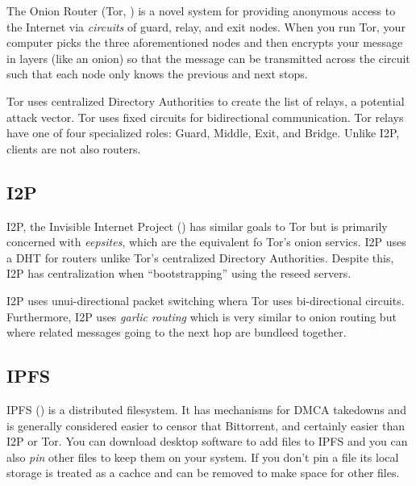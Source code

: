 The Onion Router (Tor, \cite{TorProjectPrivacy}) is a novel system for providing
anonymous access to the Internet via \emph{circuits} of guard, relay, and exit
nodes. When you run Tor, your computer picks the three aforementioned nodes and
then encrypts your message in layers (like an onion) so that the message can be
transmitted across the circuit such that each node only knows the previous and
next stops.



Tor uses centralized Directory Authorities \cite{TorProjectDirectory} to create
the list of relays, a potential attack vector. Tor uses fixed circuits for
bidirectional communication.\cite{AnalyzingTrendsTor} Tor relays have one of
four specialized roles: Guard, Middle, Exit, and Bridge. Unlike I2P, clients are
not also routers.

\subsection{I2P}\label{i2p}

I2P, the Invisible Internet Project (\cite{I2PAnonymousNetwork}) has similar
goals to Tor but is primarily concerned with \emph{eepsites}, which are the
equivalent fo Tor's onion servics. I2P uses a DHT for routers unlike Tor's
centralized Directory Authorities.\cite{NetworkDatabaseI2P} Despite this, I2P
has centralization when ``bootstrapping'' using the reseed servers.

I2P uses unui-directional packet switching \cite{I2PComparedTor} whera Tor uses
bi-directional circuits. Furthermore, I2P uses \emph{garlic routing} which is
very similar to onion routing but where related messages going to the next hop
are bundleed together.

\subsection{IPFS}\label{ipfs}

IPFS (\cite{IPFSBuildingBlocks}) is a distributed filesystem. It has mechanisms
for DMCA takedowns and is generally considered easier to censor that Bittorrent,
and certainly easier than I2P or Tor. You can download desktop software to add
files to IPFS and you can also \emph{pin} other files to keep them on your
system. If you don't pin a file its local storage is treated as a cachce
\cite{HostSinglepageWebsite} and can be removed to make space for other files.

